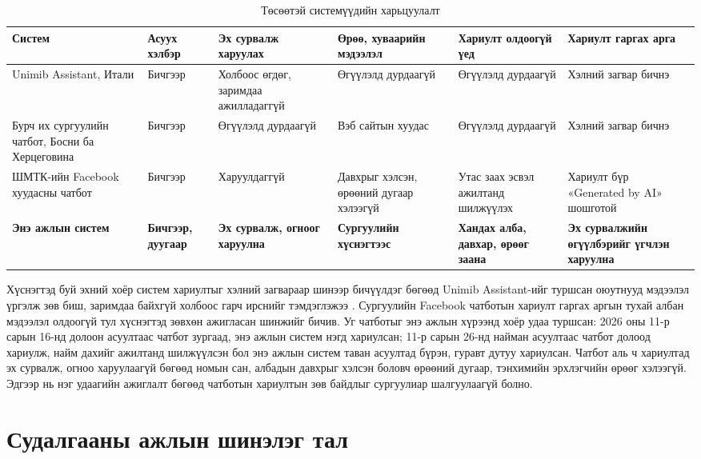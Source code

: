 \begin{table}[htbp]
\centering
\caption{Төсөөтэй системүүдийн харьцуулалт}
\label{tab:similar_systems}
\small
\begin{tabular}{|p{2.6cm}|p{1.5cm}|p{2.2cm}|p{2.4cm}|p{2.6cm}|p{2.3cm}|}
\hline
\textbf{Систем} & \textbf{Асуух хэлбэр} & \textbf{Эх сурвалж харуулах} & \textbf{Өрөө, хуваарийн мэдээлэл} & \textbf{Хариулт олдоогүй үед} & \textbf{Хариулт гаргах арга} \\
\hline
Unimib Assistant, Итали \cite{antico2024unimib} & Бичгээр & Холбоос өгдөг, заримдаа ажилладаггүй & Өгүүлэлд дурдаагүй & Өгүүлэлд дурдаагүй & Хэлний загвар бичнэ \\
\hline
Бурч их сургуулийн чатбот, Босни ба Херцеговина \cite{matic2026burch} & Бичгээр & Өгүүлэлд дурдаагүй & Вэб сайтын хуудас & Өгүүлэлд дурдаагүй & Хэлний загвар бичнэ \\
\hline
ШМТК-ийн Facebook хуудасны чатбот & Бичгээр & Харуулдаггүй & Давхрыг хэлсэн, өрөөний дугаар хэлээгүй & Утас заах эсвэл ажилтанд шилжүүлэх & Хариулт бүр «Generated by AI» шошготой \\
\hline
\textbf{Энэ ажлын систем} & \textbf{Бичгээр, дуугаар} & \textbf{Эх сурвалж, огноог харуулна} & \textbf{Сургуулийн хүснэгтээс} & \textbf{Хандах алба, давхар, өрөөг заана} & \textbf{Эх сурвалжийн өгүүлбэрийг үгчлэн харуулна} \\
\hline
\end{tabular}
\end{table}

Хүснэгтэд буй эхний хоёр систем хариултыг хэлний загвараар шинээр бичүүлдэг бөгөөд Unimib Assistant-ийг туршсан оюутнууд мэдээлэл үргэлж зөв биш, заримдаа байхгүй холбоос гарч ирснийг тэмдэглэжээ \cite{antico2024unimib}. Сургуулийн Facebook чатботын хариулт гаргах аргын тухай албан мэдээлэл олдоогүй тул хүснэгтэд зөвхөн ажигласан шинжийг бичив. Уг чатботыг энэ ажлын хүрээнд хоёр удаа туршсан: 2026 оны 11-р сарын 16-нд долоон асуултаас чатбот зургаад, энэ ажлын систем нэгд хариулсан; 11-р сарын 26-нд найман асуултаас чатбот долоод хариулж, найм дахийг ажилтанд шилжүүлсэн бол энэ ажлын систем таван асуултад бүрэн, гуравт дутуу хариулсан. Чатбот аль ч хариултад эх сурвалж, огноо харуулаагүй бөгөөд номын сан, албадын давхрыг хэлсэн боловч өрөөний дугаар, тэнхимийн эрхлэгчийн өрөөг хэлээгүй. Эдгээр нь нэг удаагийн ажиглалт бөгөөд чатботын хариултын зөв байдлыг сургуулиар шалгуулаагүй болно.

\section{Судалгааны ажлын шинэлэг тал}
\label{sec:lit-novelty}

